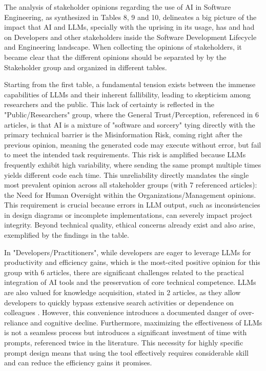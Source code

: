 The analysis of stakeholder opinions regarding the use of AI in Software Engineering, as synthesized in Tables 8, 9 and 10, delineates a big picture of the impact that AI and LLMs, specially with the uprising in its usage, has and had on Developers and other stakeholders inside the Software Development Lifecycle and Engineering landscape. When collecting the opinions of stakeholders, it became clear that the different opinions should be separated by by the Stakeholder group and organized in different tables. 

Starting from the first table, a fundamental tension exists between the immense capabilities of LLMs and their inherent fallibility, leading to skepticism among researchers and the public. This lack of certainty is reflected in the "Public/Researchers" group, where the General Trust/Perception, referenced in 6 articles, is that AI is a mixture of "software and sorcery" tying directly with the  primary technical barrier is the Misinformation Risk, coming right after the previous opinion, meaning the generated code may execute without error, but fail to meet the intended task requirements. This risk is amplified because LLMs frequently exhibit high variability, where sending the same prompt multiple times yields different code each time. This unreliability directly mandates the single most prevalent opinion across all stakeholder groups (with 7 referenced articles): the Need for Human Oversight within the Organizations/Management opinions. This requirement is crucial because errors in LLM output, such as inconsistencies in design diagrams or incomplete implementations, can severely impact project integrity. Beyond technical quality, ethical concerns already exist and also arise, exemplified by the findings in the table.

In "Developers/Practitioners", while developers are eager to leverage LLMs for productivity and efficiency gains, which is the most-cited positive opinion for this group with 6 articles, there are significant challenges related to the practical integration of AI tools and the preservation of core technical competence. LLMs are also valued for knowledge acquisition, stated in 2 articles, as they allow developers to quickly bypass extensive search activities or dependence on colleagues \cite{Banh:2025cf}. However, this convenience introduces a documented danger of over-reliance and cognitive decline. Furthermore, maximizing the effectiveness of LLMs is not a seamless process but introduces a significant investment of time with prompts, referenced twice in the literature\cite{Banh:2025cf}. This necessity for highly specific prompt design means that using the tool effectively requires considerable skill and can reduce the efficiency gains it promises. 


